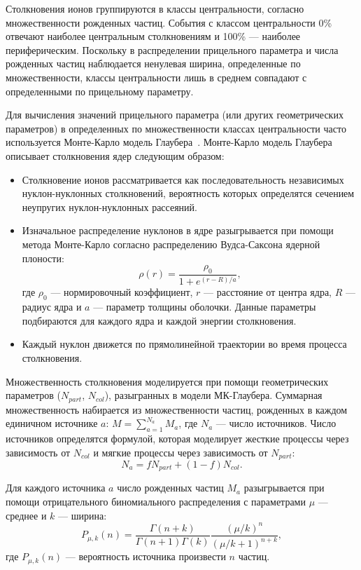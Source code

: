 Столкновения ионов группируются в классы центральности, согласно множественности рожденных частиц.
События с классом центральности 0\% отвечают наиболее центральным столкновениям и 100\% --- наиболее периферическим.
Поскольку в распределении прицельного параметра и числа рожденных частиц наблюдается ненулевая ширина, определенные по множественности, классы центральности лишь в среднем совпадают с определенными по прицельному параметру.

Для вычисления значений прицельного параметра (или других геометрических параметров) в определенных по множественности классах центральности часто используется Монте-Карло модель Глаубера~\cite{Miller:2007ri}.
Монте-Карло модель Глаубера описывает столкновения ядер следующим образом:
\begin{itemize}
    \item Столкновение ионов рассматривается как последовательность независимых нуклон-нуклонных столкновений, вероятность которых определятся сечением неупругих нуклон-нуклонных рассеяний.
    \item Изначальное распределение нуклонов в ядре разыгрывается при помощи метода Монте-Карло согласно распределению Вудса-Саксона ядерной плоности:
    \begin{equation}
        \rho(r) = \frac{ \rho_0 }{ 1 + e^{ (r-R)/a } },
        \label{eq:woods_saxon}
    \end{equation}
    где $\rho_0$ --- нормировочный коэффициент, $r$ --- расстояние от центра ядра, $R$ --- радиус ядра и $a$ --- параметр толщины оболочки.
    Данные параметры подбираются для каждого ядра и каждой энергии столкновения.
    \item Каждый нуклон движется по прямолинейной траектории во время процесса столкновения.
\end{itemize}

Множественность столкновения моделируется при помощи геометрических параметров ($N_{part}$, $N_{col}$), разыгранных в модели МК-Глаубера.
Суммарная множественность набирается из множественности частиц, рожденных в каждом единичном источнике $a$: $M=\sum_{a=1}^{N_a} M_a$, где $N_a$ --- число источников.
Число источников определятся формулой, которая моделирует жесткие процессы через зависимость от $N_{col}$ и мягкие процессы через зависимость от $N_{part}$:
\begin{equation}
    N_a = f N_{part} + (1-f) N_{col}.
\end{equation}

Для каждого источника $a$ число рожденных частиц $M_a$ разыгрывается при помощи отрицательного биномиального распределения с параметрами $\mu$ --- среднее и $k$ --- ширина:
\begin{equation}
    P_{\mu,k}(n) = \frac{ \Gamma (n+k) }{ \Gamma(n+1) \Gamma(k) } \frac{ (\mu/k)^n }{ (\mu/k+1)^{n+k} },
\end{equation}
где $P_{\mu,k}(n)$ --- вероятность источника произвести $n$ частиц.

